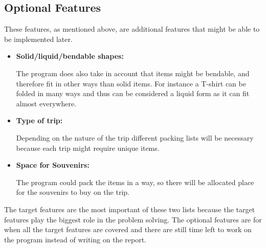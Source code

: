 \subsection{Optional Features}
These features, as mentioned above, are additional features that might be able to be implemented later.\newline

\begin{itemize}
\item \textbf{Solid/liquid/bendable shapes:}

The program does also take in account that items might be bendable, and therefore fit in other ways than solid items. For instance a T-shirt can be folded in many ways and thus can be considered a liquid form as it can fit almost everywhere.

\item \textbf{Type of trip:}

Depending on the nature of the trip different packing lists will be necessary because each trip might require unique items.

\item \textbf{Space for Souvenirs:}

The program could pack the items in a way, so there will be allocated place for the souvenirs to buy on the trip.
\end{itemize}

The target features are the most important of these two lists because the target features play the biggest role in the problem solving. The optional features are for when all the target features are covered and there are still time left to work on the program instead of writing on the report.